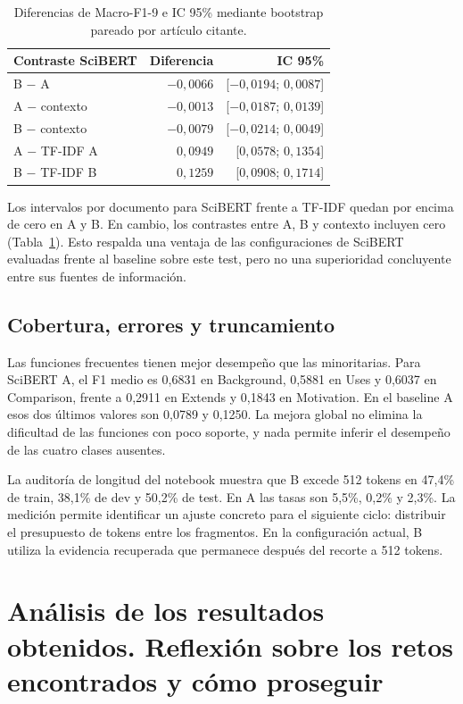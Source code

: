 \documentclass[10pt,a4paper,twocolumn]{article}
\begin{document}
\begin{table}[t]
\centering\small
\caption{Diferencias de Macro-F1-9 e IC 95\% mediante bootstrap pareado por artículo citante.}\label{tab:ci}
\setlength{\tabcolsep}{3pt}
\begin{tabular}{lrr}\toprule
Contraste SciBERT & Diferencia & IC 95\%\\\midrule
B $-$ A & $-0,0066$ & [$-0,0194$; $0,0087$]\\
A $-$ contexto & $-0,0013$ & [$-0,0187$; $0,0139$]\\
B $-$ contexto & $-0,0079$ & [$-0,0214$; $0,0049$]\\
A $-$ TF-IDF A & $0,0949$ & [$0,0578$; $0,1354$]\\
B $-$ TF-IDF B & $0,1259$ & [$0,0908$; $0,1714$]\\\bottomrule
\end{tabular}
\end{table}

Los intervalos por documento para SciBERT frente a TF-IDF quedan por encima de cero en A y B. En cambio, los contrastes entre A, B y contexto incluyen cero (Tabla~\ref{tab:ci}). Esto respalda una ventaja de las configuraciones de SciBERT evaluadas frente al baseline sobre este test, pero no una superioridad concluyente entre sus fuentes de información.

\subsection{Cobertura, errores y truncamiento}
Las funciones frecuentes tienen mejor desempeño que las minoritarias. Para SciBERT A, el F1 medio es 0,6831 en Background, 0,5881 en Uses y 0,6037 en Comparison, frente a 0,2911 en Extends y 0,1843 en Motivation. En el baseline A esos dos últimos valores son 0,0789 y 0,1250. La mejora global no elimina la dificultad de las funciones con poco soporte, y nada permite inferir el desempeño de las cuatro clases ausentes.

La auditoría de longitud del notebook muestra que B excede 512 tokens en 47,4\% de train, 38,1\% de dev y 50,2\% de test. En A las tasas son 5,5\%, 0,2\% y 2,3\%. La medición permite identificar un ajuste concreto para el siguiente ciclo: distribuir el presupuesto de tokens entre los fragmentos. En la configuración actual, B utiliza la evidencia recuperada que permanece después del recorte a 512 tokens.

\section{Análisis de los resultados obtenidos. Reflexión sobre los retos encontrados y cómo proseguir}
\end{document}
